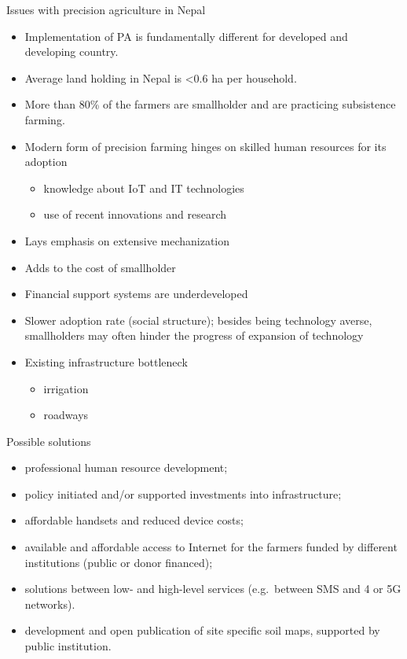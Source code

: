 \documentclass[11pt,dvipsnames,ignorenonframetext,aspectratio=169]{beamer}
\providecommand{\tightlist}{%
  \setlength{\itemsep}{0pt}\setlength{\parskip}{0pt}}
\begin{document}
\begin{frame}{Issues with precision agriculture in Nepal}
\protect\hypertarget{issues-with-precision-agriculture-in-nepal}{}
\begin{itemize}
\tightlist
\item
  Implementation of PA is fundamentally different for developed and
  developing country.
\item
  Average land holding in Nepal is \textless0.6 ha per household.
\item
  More than 80\% of the farmers are smallholder and are practicing
  subsistence farming.
\item
  Modern form of precision farming hinges on skilled human resources for
  its adoption

  \begin{itemize}
  \tightlist
  \item
    knowledge about IoT and IT technologies
  \item
    use of recent innovations and research
  \end{itemize}
\item
  Lays emphasis on extensive mechanization
\item
  Adds to the cost of smallholder
\item
  Financial support systems are underdeveloped
\item
  Slower adoption rate (social structure); besides being technology
  averse, smallholders may often hinder the progress of expansion of
  technology
\item
  Existing infrastructure bottleneck

  \begin{itemize}
  \tightlist
  \item
    irrigation
  \item
    roadways
  \end{itemize}
\end{itemize}
\end{frame}

\begin{frame}{Possible solutions}
\protect\hypertarget{possible-solutions}{}
\begin{itemize}
\tightlist
\item
  professional human resource development;
\item
  policy initiated and/or supported investments into infrastructure;
\item
  affordable handsets and reduced device costs;
\item
  available and affordable access to Internet for the farmers funded by
  different institutions (public or donor financed);
\item
  solutions between low- and high-level services (e.g.~between SMS and 4
  or 5G networks).
\item
  development and open publication of site specific soil maps, supported
  by public institution.
\end{itemize}
\end{frame}
\end{document}

